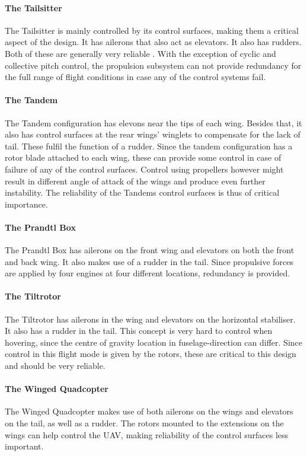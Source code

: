 \paragraph{The Tailsitter}
The Tailsitter is mainly controlled by its control surfaces, making them a critical aspect of the design. It has ailerons that also act as elevators. It also has rudders. Both of these are generally very reliable \cite{reliability}. With the exception of cyclic and collective pitch control, the propulsion subsystem can not provide redundancy for the full range of flight conditions in case any of the control systems fail.

\paragraph{The Tandem}
The Tandem configuration has elevons near the tips of each wing. Besides that, it also has control surfaces at the rear wings' winglets to compensate for the lack of tail. These fulfil the function of a rudder. Since the tandem configuration has a rotor blade attached to each wing, these can provide some control in case of failure of any of the control surfaces. Control using propellers however might result in different angle of attack of the wings and produce even further instability. The reliability of the Tandems control surfaces is thus of critical importance. 

\paragraph{The Prandtl Box}
The Prandtl Box has ailerons on the front wing and elevators on both the front and back wing. It also makes use of a rudder in the tail. Since propulsive forces are applied by four engines at four different locations, redundancy is provided.

\paragraph{The Tiltrotor}
The Tiltrotor has ailerons in the wing and elevators on the horizontal stabiliser. It also has a rudder in the tail. This concept is very hard to control when hovering, since the centre of gravity location in fuselage-direction can differ. Since control in this flight mode is given by the rotors, these are critical to this design and should be very reliable.

\paragraph{The Winged Quadcopter}
The Winged Quadcopter makes use of both ailerons on the wings and elevators on the tail, as well as a rudder. The rotors mounted to the extensions on the wings can help control the UAV, making reliability of the control surfaces less important.





